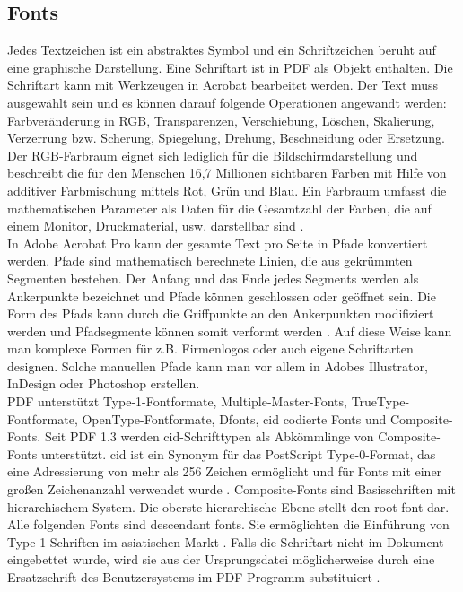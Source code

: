 \subsection{Fonts}
Jedes Textzeichen ist ein abstraktes Symbol und ein Schriftzeichen beruht auf eine graphische Darstellung. Eine Schriftart ist in PDF als Objekt enthalten. Die Schriftart kann mit Werkzeugen in Acrobat bearbeitet werden. Der Text muss ausgewählt sein und es können darauf folgende Operationen angewandt werden: Farbveränderung in RGB, Transparenzen, Verschiebung, Löschen, Skalierung, Verzerrung bzw. Scherung, Spiegelung, Drehung, Beschneidung oder Ersetzung. Der RGB-Farbraum eignet sich lediglich für die Bildschirmdarstellung und beschreibt die für den Menschen 16,7 Millionen sichtbaren Farben mit Hilfe von additiver Farbmischung mittels Rot, Grün und Blau. Ein Farbraum umfasst die mathematischen Parameter als Daten für die Gesamtzahl der Farben, die auf einem Monitor, Druckmaterial, usw. darstellbar sind \cite{farbraum}. \\
In Adobe Acrobat Pro kann der gesamte Text pro Seite in Pfade konvertiert werden. Pfade sind mathematisch berechnete Linien, die aus gekrümmten Segmenten bestehen. Der Anfang und das Ende jedes Segments werden als Ankerpunkte bezeichnet und Pfade können geschlossen oder geöffnet sein. Die Form des Pfads kann durch die Griffpunkte an den Ankerpunkten modifiziert werden und Pfadsegmente können somit verformt werden \cite{adobe-pfade}.  Auf diese Weise kann man komplexe Formen für z.B. Firmenlogos oder auch eigene Schriftarten designen. Solche manuellen Pfade kann man vor allem in Adobes Illustrator, InDesign oder Photoshop erstellen. \\ 
PDF unterstützt Type-1-Fontformate, Multiple-Master-Fonts, TrueType-Fontformate, OpenType-Fontformate, Dfonts, \gls{cid} codierte Fonts und Composite-Fonts. Seit PDF 1.3 werden \gls{cid}-Schrifttypen als Abkömmlinge von Composite-Fonts unterstützt. \gls{cid} ist ein Synonym für das PostScript Type-0-Format, das eine Adressierung von mehr als 256 Zeichen ermöglicht und für Fonts mit einer großen Zeichenanzahl verwendet wurde \cite{typoinfo}. Composite-Fonts sind Basisschriften mit hierarchischem System. Die oberste hierarchische Ebene stellt den root font dar. Alle folgenden Fonts sind descendant fonts. Sie ermöglichten die Einführung von Type-1-Schriften im asiatischen Markt \cite{schneeberger}. Falls die Schriftart nicht im Dokument eingebettet wurde, wird sie aus der Ursprungsdatei möglicherweise durch eine Ersatzschrift des Benutzersystems im PDF-Programm substituiert \cite{schneeberger}. 

